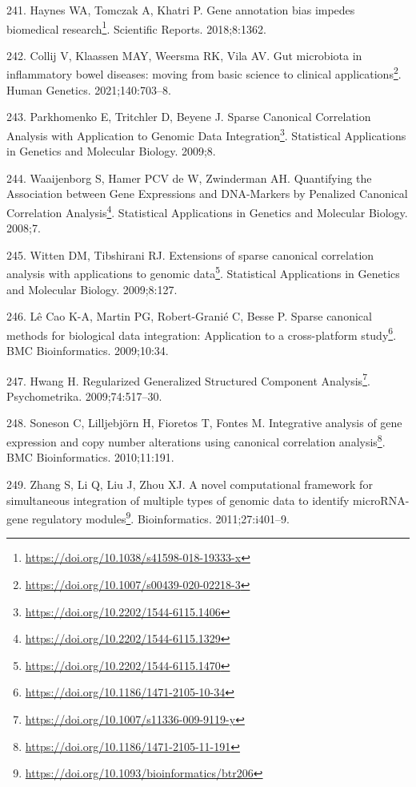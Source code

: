 \documentclass[
  12pt,
  a4paper,
  twoside,
  openright]{book}
\DeclareRobustCommand{\href}[2]{#2\footnote{\url{#1}}}
\newlength{\cslhangindent}
\newlength{\cslentryspacingunit} %
\newenvironment{CSLReferences}[2] %
 {%
  \setlength{\parindent}{0pt}
  \ifodd #1
  \let\oldpar\par
  \def\par{\hangindent=\cslhangindent\oldpar}
  \fi
  \setlength{\parskip}{#2\cslentryspacingunit}
 }%
 {}
\begin{document}
\begin{CSLReferences}{0}{0}
\leavevmode{}%
241. Haynes WA, Tomczak A, Khatri P. \href{https://doi.org/10.1038/s41598-018-19333-x}{Gene annotation bias impedes biomedical research}. Scientific Reports. 2018;8:1362.

\leavevmode{}%
242. Collij V, Klaassen MAY, Weersma RK, Vila AV. \href{https://doi.org/10.1007/s00439-020-02218-3}{Gut microbiota in inflammatory bowel diseases: moving from basic science to clinical applications}. Human Genetics. 2021;140:703--8.

\leavevmode{}%
243. Parkhomenko E, Tritchler D, Beyene J. \href{https://doi.org/10.2202/1544-6115.1406}{Sparse Canonical Correlation Analysis with Application to Genomic Data Integration}. Statistical Applications in Genetics and Molecular Biology. 2009;8.

\leavevmode{}%
244. Waaijenborg S, Hamer PCV de W, Zwinderman AH. \href{https://doi.org/10.2202/1544-6115.1329}{Quantifying the Association between Gene Expressions and DNA-Markers by Penalized Canonical Correlation Analysis}. Statistical Applications in Genetics and Molecular Biology. 2008;7.

\leavevmode{}%
245. Witten DM, Tibshirani RJ. \href{https://doi.org/10.2202/1544-6115.1470}{Extensions of sparse canonical correlation analysis with applications to genomic data}. Statistical Applications in Genetics and Molecular Biology. 2009;8:127.

\leavevmode{}%
246. Lê Cao K-A, Martin PG, Robert-Granié C, Besse P. \href{https://doi.org/10.1186/1471-2105-10-34}{Sparse canonical methods for biological data integration: Application to a cross-platform study}. BMC Bioinformatics. 2009;10:34.

\leavevmode{}%
247. Hwang H. \href{https://doi.org/10.1007/s11336-009-9119-y}{Regularized Generalized Structured Component Analysis}. Psychometrika. 2009;74:517--30.

\leavevmode{}%
248. Soneson C, Lilljebjörn H, Fioretos T, Fontes M. \href{https://doi.org/10.1186/1471-2105-11-191}{Integrative analysis of gene expression and copy number alterations using canonical correlation analysis}. BMC Bioinformatics. 2010;11:191.

\leavevmode{}%
249. Zhang S, Li Q, Liu J, Zhou XJ. \href{https://doi.org/10.1093/bioinformatics/btr206}{A novel computational framework for simultaneous integration of multiple types of genomic data to identify microRNA-gene regulatory modules}. Bioinformatics. 2011;27:i401--9.


\end{CSLReferences}
\end{document}
